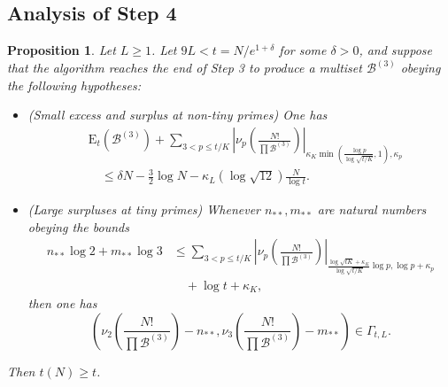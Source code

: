 \documentclass[12pt,a4paper,reqno]{amsart}
\numberwithin{equation}{section}
\theoremstyle{plain}
\newtheorem{proposition}[theorem]{Proposition}
\theoremstyle{definition}
\newcommand\tuple{{\mathcal B}}
\newcommand\excess{{\mathrm{E}}}
\begin{document}
\subsection{Analysis of Step 4}

\begin{proposition}\label{step4-reduce}  Let $L \geq 1$.  Let $9L < t = N/e^{1+\delta}$ for some $\delta>0$, and suppose that the algorithm reaches the end of Step 3 to produce a multiset $\tuple^{(3)}$ obeying the following hypotheses:
  \begin{itemize}
  \item[(i)] (Small excess and surplus at non-tiny primes) One has
\begin{equation}\label{new-balance-5}
    \begin{split}
&      \excess_t(\tuple^{(3)}) + \sum_{3 < p \leq t/K}
   \left|\nu_p\left(\frac{N!}{\prod \tuple^{(3)}}\right)\right|_{\kappa_K \min(\frac{\log p}{\log\sqrt{t/K}},1),\kappa_p}\\
&\quad    \leq \delta N - \frac{3}{2} \log N - \kappa_L (\log \sqrt{12}) \frac{N}{\log t}.
    \end{split}
  \end{equation}
  \item[(ii)] (Large surpluses at tiny primes) 
  Whenever $n_{**}, m_{**}$ are natural numbers obeying the bounds
  \begin{equation}\label{nstarb}
    \begin{split}
   n_{**} \log 2 + m_{**} \log 3 &\leq 
    \sum_{3 < p \leq t/K}
    \left|\nu_p\left(\frac{N!}{\prod \tuple^{(3)}}\right)\right|_{\frac{\log \sqrt{tK} + \kappa_K}{\log\sqrt{t/K}} \log p,\log p+\kappa_p}\\
  &\quad  + \log t + \kappa_K,
  \end{split}
\end{equation}
    then one has
  \begin{equation}\label{sector}\left( \nu_2\left(\frac{N!}{\prod \tuple^{(3)}}\right) - n_{**}, \nu_3\left(\frac{N!}{\prod \tuple^{(3)}}\right) - m_{**}\right) \in \Gamma_{t,L}.
  \end{equation}
  \end{itemize}
     Then $t(N) \geq t$.
\end{proposition}
\end{document}
